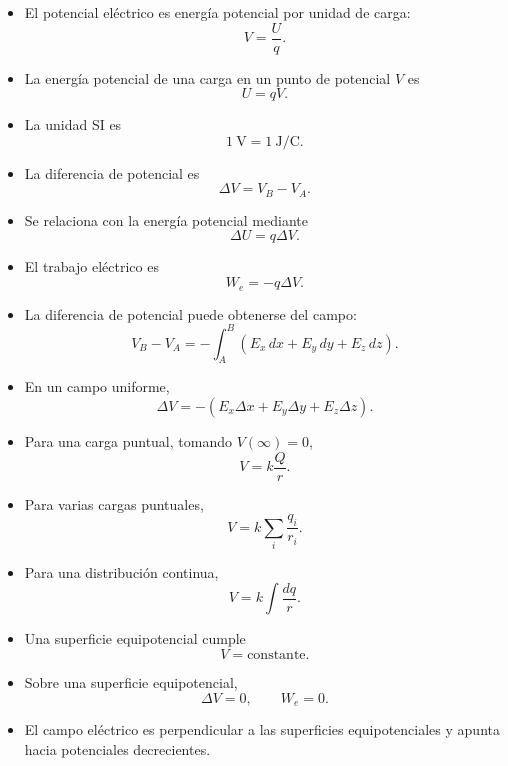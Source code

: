 \begin{resumen}

\begin{itemize}
    \item El potencial eléctrico es energía potencial por unidad de carga:
    \[
    \boxed{V=\frac{U}{q}}.
    \]

    \item La energía potencial de una carga en un punto de potencial \(V\) es
    \[
    \boxed{U=qV}.
    \]

    \item La unidad SI es
    \[
    \boxed{\SI{1}{\volt}=\SI{1}{\joule\per\coulomb}}.
    \]

    \item La diferencia de potencial es
    \[
    \boxed{\Delta V=V_B-V_A}.
    \]

    \item Se relaciona con la energía potencial mediante
    \[
    \boxed{\Delta U=q\Delta V}.
    \]

    \item El trabajo eléctrico es
    \[
    \boxed{W_e=-q\Delta V}.
    \]

    \item La diferencia de potencial puede obtenerse del campo:
    \[
    \boxed{
    V_B-V_A
    =
    -\int_A^B
    (E_x\,dx+E_y\,dy+E_z\,dz)
    }.
    \]

    \item En un campo uniforme,
    \[
    \boxed{
    \Delta V
    =
    -(E_x\Delta x+E_y\Delta y+E_z\Delta z)
    }.
    \]

    \item Para una carga puntual, tomando \(V(\infty)=0\),
    \[
    \boxed{V=k\frac{Q}{r}}.
    \]

    \item Para varias cargas puntuales,
    \[
    \boxed{
    V=k\sum_i\frac{q_i}{r_i}
    }.
    \]

    \item Para una distribución continua,
    \[
    \boxed{
    V=k\int\frac{dq}{r}
    }.
    \]

    \item Una superficie equipotencial cumple
    \[
    \boxed{V=\text{constante}}.
    \]

    \item Sobre una superficie equipotencial,
    \[
    \boxed{\Delta V=0,\qquad W_e=0}.
    \]

    \item El campo eléctrico es perpendicular a las superficies equipotenciales y apunta
    hacia potenciales decrecientes.


\end{itemize}
\end{resumen}
